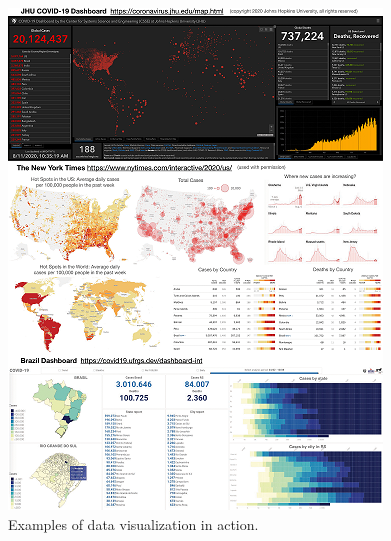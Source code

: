 \begin{figure}[htbp]
\centerline{\includegraphics{Chapitre1/dashboard.png}}
\caption{Examples of data visualization in action.}
\label{fig}
\end{figure}